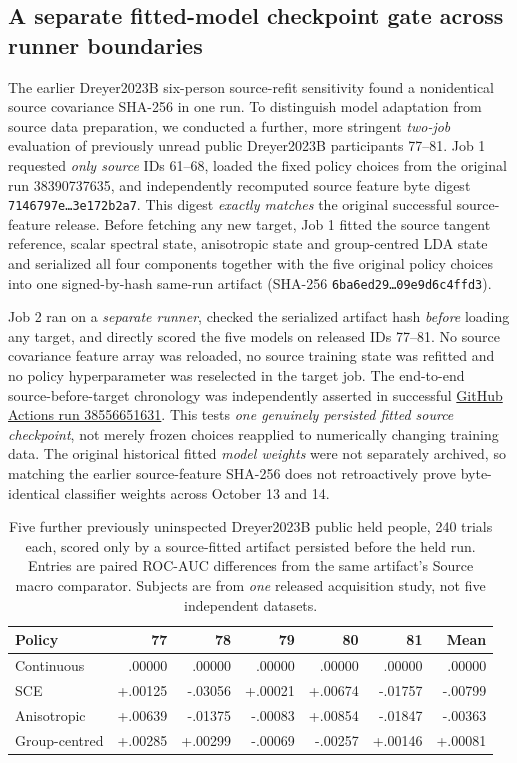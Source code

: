 \subsection{A separate fitted-model checkpoint gate across runner boundaries}
\label{sec:p3-dreyerb-checkpointed-77-81}
The earlier Dreyer2023B six-person source-refit sensitivity
found a nonidentical source covariance SHA-256 in one
run. To distinguish model adaptation from source data
preparation, we conducted a further, more stringent
\emph{two-job} evaluation of previously unread
public Dreyer2023B participants 77--81.
Job 1 requested \emph{only source} IDs 61--68,
loaded the fixed policy choices from the original
run 38390737635, and independently recomputed
source feature byte digest
\texttt{7146797e\ldots 3e172b2a7}. This digest
\emph{exactly matches} the original successful
source-feature release. Before fetching any
new target, Job 1 fitted the source tangent
reference, scalar spectral state, anisotropic
state and group-centred LDA state and serialized
all four components together with the five
original policy choices into one signed-by-hash
same-run artifact (SHA-256
\texttt{6ba6ed29\ldots 09e9d6c4ffd3}).

Job 2 ran on a \emph{separate runner}, checked
the serialized artifact hash \emph{before}
loading any target, and directly scored
the five models on released IDs 77--81.
No source covariance feature array was
reloaded, no source training state was
refitted and no policy hyperparameter was
reselected in the target job. The end-to-end
source-before-target chronology was independently
asserted in successful
\href{https://github.com/lindicaphxag-tech/kaggle/actions/runs/38556651631}
{GitHub Actions run 38556651631}.
This tests \emph{one genuinely persisted fitted
source checkpoint}, not merely frozen choices
reapplied to numerically changing training data.
The original historical fitted \emph{model weights}
were not separately archived, so matching
the earlier source-feature SHA-256 does not
retroactively prove byte-identical classifier
weights across October 13 and 14.

\begin{table}[ht]
\centering\small
\caption{Five further previously uninspected Dreyer2023B
public held people, 240 trials each, scored only by a
source-fitted artifact persisted before the held
run. Entries are paired ROC-AUC differences from
the same artifact's Source macro comparator.
Subjects are from \emph{one} released acquisition study,
not five independent datasets.}
\label{tab:p3-dreyerb-five-snapshot}
\begin{tabular}{lrrrrrr}
\toprule
Policy & 77 & 78 & 79 & 80 & 81 & Mean\\
\midrule
Continuous & .00000 & .00000 & .00000 & .00000 & .00000 & .00000\\
SCE & +.00125 & -.03056 & +.00021 & +.00674 & -.01757 & -.00799\\
Anisotropic & +.00639 & -.01375 & -.00083 & +.00854 & -.01847 & -.00363\\
Group-centred & +.00285 & +.00299 & -.00069 & -.00257 & +.00146 & +.00081\\
\bottomrule
\end{tabular}
\end{table}

